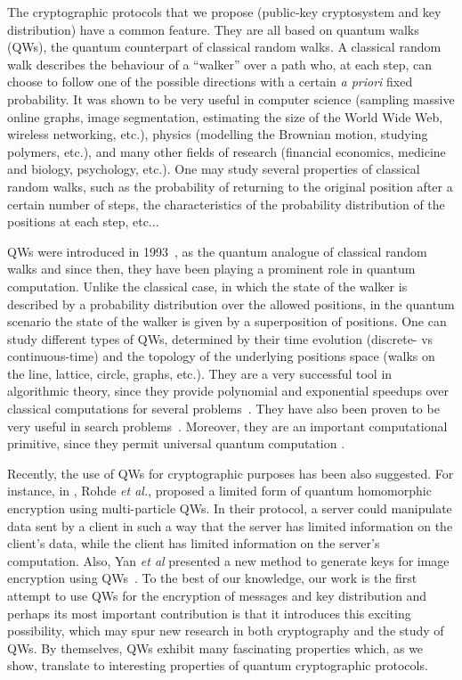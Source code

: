 The cryptographic protocols that we propose (public-key cryptosystem and key distribution) have a common feature. They are all based on quantum walks (QWs), the quantum counterpart of classical random walks. A classical random walk describes the behaviour of a ``walker'' over a path who, at each step, can choose to follow one of the possible directions with a certain {\em a priori} fixed probability. It was shown to be very useful in computer science (sampling massive online graphs, image segmentation, estimating the size of the World Wide Web, wireless networking, etc.), physics (modelling the Brownian motion, studying polymers, etc.), and many other fields of research (financial economics, medicine and biology, psychology, etc.).
One may study several properties of classical random walks, such as the probability of returning to the original position after a certain number of steps, the characteristics of the probability distribution of the positions at each step, etc...

QWs were introduced in 1993~\cite{aha:dav:zag:93}, as the quantum analogue of classical random walks and since then, they have been playing a prominent role in quantum computation. Unlike the classical case, in which the state of the walker is described by a probability distribution over the allowed positions, in the quantum scenario the state of the walker is given by a superposition of positions. One can study different types of QWs, determined by their time evolution (discrete- vs continuous-time) and the topology of the underlying positions space (walks on the line, lattice, circle, graphs, etc.).
They are a very successful tool in algorithmic theory, since they provide polynomial and exponential speedups over classical computations for several problems~\cite{far:gut:98,chi:etal:03,kem:03,amb:03}. They have also been proven to be very useful in search problems~\cite{san:08,cha:nov:amb:oma:16,nov:cha:moh:nev:oma:16,por:13}. Moreover, they are an important computational primitive, since they permit universal quantum computation \cite{chi:09,lov:coo:eve:tre:ken:10,chi:gos:web:13}.

Recently, the use of QWs for cryptographic purposes has been also suggested. For instance, in \cite{roh:fit:gil:15}, Rohde {\em et al.}, proposed a limited form of quantum homomorphic encryption using multi-particle QWs. In their protocol, a server could manipulate data sent by a client in such a way that the server has limited information on the client's data, while the client has limited information on the server's computation. Also, Yan {\it et al} presented a new method to generate keys for image encryption using QWs~\cite{yan:pan:sun:xu:15}.
To the best of our knowledge, our work is the first attempt to use QWs for the encryption of messages and key distribution and perhaps its most important contribution is that it introduces this exciting possibility, which may spur new research in both cryptography and the study of QWs. By themselves, QWs exhibit many fascinating properties which, as we show, translate to interesting properties of quantum cryptographic protocols.

